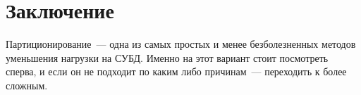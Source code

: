 



\section{Заключение}

Партиционирование~--- одна из самых простых и менее безболезненных методов уменьшения нагрузки на СУБД. Именно на этот вариант стоит посмотреть сперва, и если он не подходит по каким либо причинам~--- переходить к более сложным.
